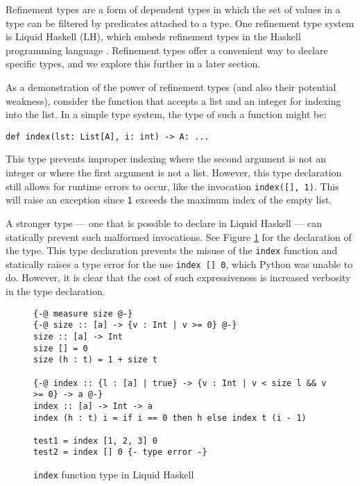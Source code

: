 \documentclass{report}
\begin{document}
Refinement types are a form of dependent types in which the set of values in a type can be filtered by predicates attached to a type. One refinement type system is Liquid Haskell (LH), which embeds refinement types in the Haskell programming language \cite{Jhala2014RefinementTF}. Refinement types offer a convenient way to declare specific types, and we explore this further in a later section.

As a demonstration of the power of refinement types (and also their potential weakness), consider the function that accepts a list and an integer for indexing into the list. In a simple type system, the type of such a function might be:

\begin{singlespace*}
\begin{center} \texttt{def index(lst: List[A], i: int) -> A: ...} \end{center} \end{singlespace*}

This type prevents improper indexing where the second argument is not an integer or where the first argument is not a list. However, this type declaration still allows for runtime errors to occur, like the invocation \texttt{index([], 1)}. This will raise an exception since \texttt{1} exceeds the maximum index of the empty list.

A stronger type --- one that is possible to declare in Liquid Haskell --- can statically prevent such malformed invocations. See Figure \ref{lh-type-indexing} for the declaration of the type. This type declaration prevents the misuse of the \texttt{index} function and statically raises a type error for the use \texttt{index [] 0}, which Python was unable to do. However, it is clear that the cost of such expressiveness is increased verbosity in the type declaration.

\begin{figure}
    \centering
    \begin{verbatim}
{-@ measure size @-}
{-@ size :: [a] -> {v : Int | v >= 0} @-}
size :: [a] -> Int
size [] = 0
size (h : t) = 1 + size t

{-@ index :: {l : [a] | true} -> {v : Int | v < size l && v >= 0} -> a @-}
index :: [a] -> Int -> a
index (h : t) i = if i == 0 then h else index t (i - 1)

test1 = index [1, 2, 3] 0
test2 = index [] 0 {- type error -}\end{verbatim}
    \caption{\texttt{index} function type in Liquid Haskell}
    \label{lh-type-indexing}
\end{figure}
\end{document}
